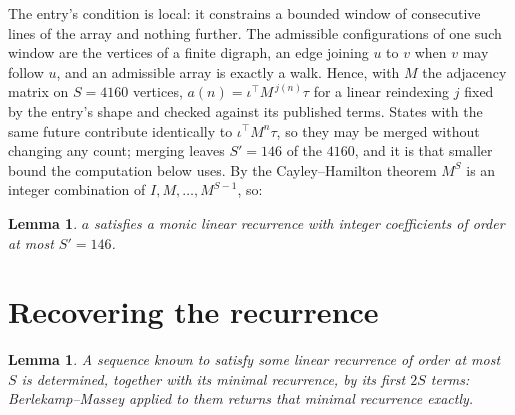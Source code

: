 \documentclass[11pt,a4paper]{article}
\theoremstyle{plain}
\newtheorem{lemma}[theorem]{Lemma}
\theoremstyle{definition}
\begin{document}
The entry's condition is local: it constrains a bounded window of consecutive lines of the
array and nothing further. The admissible configurations of one such window are the vertices
of a finite digraph, an edge joining $u$ to $v$ when $v$ may follow $u$, and an admissible
array is exactly a walk. Hence, with $M$ the adjacency matrix on $S=4160$ vertices,
$a(n)=\iota^{\!\top}M^{\,j(n)}\tau$ for a linear reindexing $j$ fixed by the entry's shape
and checked against its published terms. States with the same future contribute identically to $\iota^{\!\top}M^n\tau$, so they may be merged without changing any count; merging leaves $S'=146$ of the $4160$, and it is that smaller bound the computation below uses. By the Cayley--Hamilton theorem $M^{S}$ is an
integer combination of $I,M,\dots,M^{S-1}$, so:

\begin{lemma}\label{lem:cf}
$a$ satisfies a monic linear recurrence with integer coefficients of order at most
$S'=146$.
\end{lemma}

\section{Recovering the recurrence}

\begin{lemma}\label{lem:bm}
A sequence known to satisfy some linear recurrence of order at most $S$ is determined, together
with its minimal recurrence, by its first $2S$ terms: Berlekamp--Massey applied to them returns
that minimal recurrence exactly.
\end{lemma}
\end{document}
